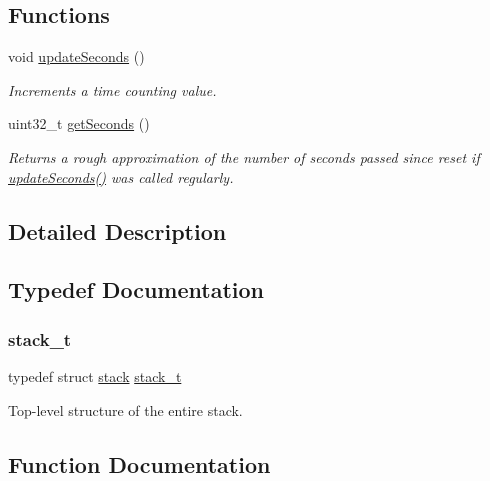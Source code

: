 \subsection*{Functions}
\begin{DoxyCompactItemize}
\item 
void \mbox{\hyperlink{group__stack_gabeccd7481529472ac536f41b0d2be690}{update\+Seconds}} ()
\begin{DoxyCompactList}\small\item\em Increments a time counting value. \end{DoxyCompactList}\item 
uint32\+\_\+t \mbox{\hyperlink{group__stack_ga232391229213d278f429714a9b551db5}{get\+Seconds}} ()
\begin{DoxyCompactList}\small\item\em Returns a rough approximation of the number of seconds passed since reset if \mbox{\hyperlink{group__stack_gabeccd7481529472ac536f41b0d2be690}{update\+Seconds()}} was called regularly. \end{DoxyCompactList}\end{DoxyCompactItemize}


\subsection{Detailed Description}


\subsection{Typedef Documentation}
\mbox{\label{group__stack_ga575defe06cb6cd9e4b02d90a916721b3}} 
\subsubsection{\texorpdfstring{stack\_t}{stack\_t}}
{\footnotesize\ttfamily typedef struct \mbox{\hyperlink{structstack}{stack}}  \mbox{\hyperlink{group__stack_ga575defe06cb6cd9e4b02d90a916721b3}{stack\+\_\+t}}}



Top-\/level structure of the entire stack. 



\subsection{Function Documentation}
\mbox{\label{group__stack_ga232391229213d278f429714a9b551db5}} 
